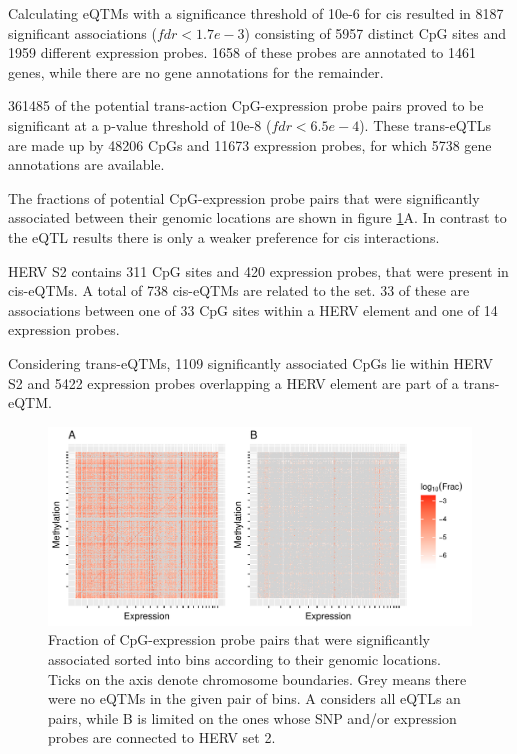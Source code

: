 \documentclass[a4paper,12pt]{article}
\begin{document}
Calculating eQTMs with a significance threshold of 10e-6 for cis resulted in 8187 significant associations ($fdr<1.7e-3$) consisting of 5957 distinct CpG sites and 1959 different expression probes. 1658 of these probes are annotated to 1461 genes, while there are no gene annotations for the remainder. 

361485 of the potential trans-action CpG-expression probe pairs proved to be significant at a p-value threshold of 10e-8 ($fdr<6.5e-4$). These trans-eQTLs are made up by 48206 CpGs and 11673 expression probes, for which 5738 gene annotations are available. 

The fractions of potential CpG-expression probe pairs that were significantly associated between their genomic locations are shown in figure \ref{fig:global.eqtm.heatmap}A. In contrast to the eQTL results there is only a weaker preference for cis interactions. 

HERV S2 contains 311 CpG sites and 420 expression probes, that were present in cis-eQTMs. A total of 738 cis-eQTMs are related to the set. 33 of these are associations between one of 33 CpG sites within a HERV element and one of 14 expression probes. 

Considering trans-eQTMs, 1109 significantly associated CpGs lie within HERV S2 and 5422 expression probes overlapping a HERV element are part of a trans-eQTM.

\begin{figure}[tb]
	\includegraphics[scale = 1, keepaspectratio = true]{../figures/eqtm_all_herv_heatmap}  
	\caption{Fraction of CpG-expression probe pairs that were significantly associated sorted into bins according to their genomic locations. Ticks on the axis denote chromosome boundaries. Grey means there were no eQTMs in the given pair of bins. A considers all eQTLs an pairs, while B is limited on the ones whose SNP and/or expression probes are connected to HERV set 2.}
    \label{fig:global.eqtm.heatmap}
\end{figure}
\end{document}
